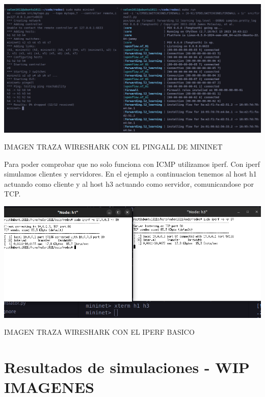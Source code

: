 \documentclass{article}
\begin{document}
\begin{center}
    \includegraphics[scale=0.23]{images/mininet_pingall.png}
\end{center}

IMAGEN TRAZA WIRESHARK CON EL PINGALL DE MININET
\begin{center}
\end{center}


Para poder comprobar que no solo funciona con ICMP utilizamos iperf. Con iperf simulamos
clientes y servidores. En el ejemplo a continuacion tenemos al host h1 actuando como cliente
y al host h3 actuando como servidor, comunicandose por TCP.

\begin{center}
\includegraphics[scale=0.37]{images/mininet_iperf_basico.png}
\end{center}

IMAGEN TRAZA WIRESHARK CON EL IPERF BASICO
\begin{center}
\end{center}

\newpage
\section{\texorpdfstring{\textbf{Resultados de simulaciones - WIP IMAGENES}}{Resultados de simulaciones}}\label{pruebas-wip}
\end{document}
